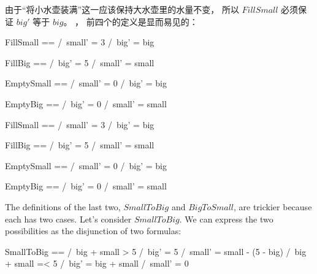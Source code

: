 \begin{ch}
  由于``将小水壶装满''这一\tlastep{}应该保持大水壶里的水量不变，
  所以\tlasubaction{} $FillSmall$ 必须保证 $big'$ 等于 $big$。
  ，
  前四个\tlasubaction{}的定义是显而易见的：
  \medskip
  \begin{twocols}%
  \begin{notla}
  FillSmall  == /\ small' = 3 
		/\ big' = big

  FillBig    == /\ big' = 5 
		/\ small' = small

  EmptySmall == /\ small' = 0 
		/\ big' = big

  EmptyBig   == /\ big' = 0 
		/\ small' = small
  \end{notla}
  \begin{tlatex}
  \@pvspace{8.0pt}%
  \@pvspace{8.0pt}%
  \@pvspace{8.0pt}%
  \end{tlatex}
  \midcol
  \begin{verbatim*}
  FillSmall  == /\ small' = 3 
		/\ big' = big

  FillBig    == /\ big' = 5 
		/\ small' = small

  EmptySmall == /\ small' = 0 
		/\ big' = big

  EmptyBig   == /\ big' = 0 
		/\ small' = small
  \end{verbatim*} 
  \end{twocols} 
  \medskip
\end{ch}
\begin{en}
The definitions of the last two, $SmallToBig$ and $BigToSmall$, are
trickier because each has two cases.  Let's consider $SmallToBig$.
We can express the two possibilities as the disjunction of two
formulas:
\begin{display}
\begin{notla}
SmallToBig == \/ /\ big + small > 5
                 /\ big' = 5
                 /\ small' = small - (5 - big)
              \/ /\ big + small =< 5
                 /\ big' = big + small
                 /\ small' = 0
\end{notla}
\begin{tlatex}
%
%
%
%
%
%
%
%
\end{tlatex}
\end{display}
\end{en}
